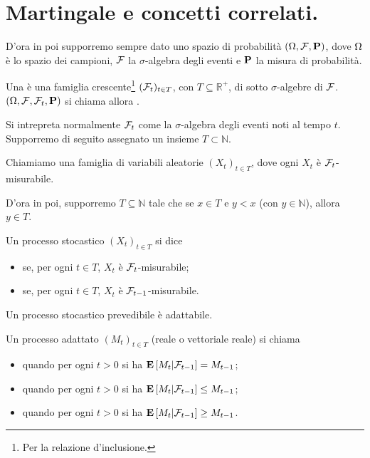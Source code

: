 \section{Martingale e concetti correlati.}\label{Martingale}
\par D'ora in poi supporremo sempre dato uno spazio di probabilit\`a $(\SamplesSpace,\SigmaAlgebra,\Probability)$, dove $\Omega$ \`e lo spazio dei campioni, $\mathcal{F}$ la $\sigma$-algebra degli eventi e $\Probability$ la misura di probabilit\`a.
\begin{Definition}
	Una  \`e una famiglia crescente\footnote{Per la relazione d'inclusione.} $(\mathcal{F}_t)_{t \in T}$, con $T \subseteq \mathbb{R}^+$, di sotto $\sigma$-algebre di $\mathcal{F}$. $(\SamplesSpace,\SigmaAlgebra,\SigmaAlgebra_t,\Probability)$ si chiama allora .
\end{Definition}
\par Si intrepreta normalmente $\mathcal{F}_t$ come la $\sigma$-algebra degli eventi noti al tempo $t$. Supporremo di seguito assegnato un insieme $T \subset \mathbb{N}$.
\begin{Definition}
	Chiamiamo  una famiglia di variabili aleatorie $(X_t)_{t \in T}$, dove ogni $X_t$ \`e $\mathcal{F}_t$-misurabile.
\end{Definition}
\par D'ora in poi, supporremo $T \subseteq \mathbb{N}$ tale che se $x \in T$ e $y < x$ (con $y \in \mathbb{N}$), allora $y \in T$.
\begin{Definition}
	Un processo stocastico $(X_t)_{t \in T}$ si dice
	\begin{itemize}
		\item {} se, per ogni $t \in T$, $X_t$ \`e $\mathcal{F}_t$-misurabile;
		\item {} se, per ogni $t \in T$, $X_t$ \`e $\mathcal{F}_{t - 1}$-misurabile.
	\end{itemize}
\end{Definition}
\par Un processo stocastico prevedibile \`e adattabile.
\begin{Definition}
	Un processo adattato $(M_t)_{t \in T}$ (reale o vettoriale reale) si chiama
	\begin{itemize}
		\item {} quando per ogni $t > 0$ si ha $\mathbf{E} \left [M_t|\mathcal{F}_{t - 1} \right ] = M_{t - 1}$;
		\item {} quando per ogni $t > 0$ si ha $\mathbf{E} \left [M_t|\mathcal{F}_{t - 1} \right ] \leq M_{t - 1}$;
		\item {} quando per ogni $t > 0$ si ha $\mathbf{E} \left [M_t|\mathcal{F}_{t - 1} \right ] \geq M_{t - 1}$.
	\end{itemize}
\end{Definition}

